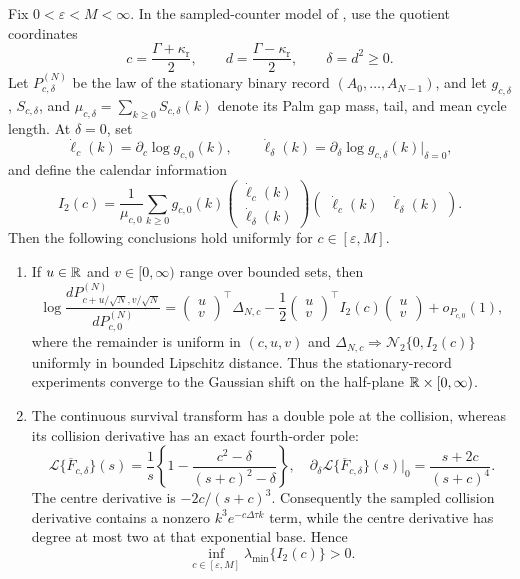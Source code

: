 \begin{paperthm}
\label{thm:stationary-two-state-collision-main}
Fix \(0<\varepsilon<M<\infty\).  In the sampled-counter model of
, use the quotient coordinates
\[
 c=\frac{\Gamma+\kappa_{\mathrm r}}2,
 \qquad d=\frac{\Gamma-\kappa_{\mathrm r}}2,
 \qquad \delta=d^2\ge0.
\tag{SC2}
\]
Let \(P_{c,\delta}^{(N)}\) be the law of the stationary binary record
\((A_0,\ldots,A_{N-1})\), and let \(g_{c,\delta}\), \(S_{c,\delta}\), and
\(\mu_{c,\delta}=\sum_{k\ge0}S_{c,\delta}(k)\) denote its Palm gap mass,
tail, and mean cycle length.  At \(\delta=0\), set
\[
 \dot\ell_c(k)=\partial_c\log g_{c,0}(k),\qquad
 \dot\ell_\delta(k)=\partial_\delta\log g_{c,\delta}(k)|_{\delta=0},
\]
and define the calendar information
\[
 I_2(c)=\frac1{\mu_{c,0}}
 \sum_{k\ge0}g_{c,0}(k)
 \begin{pmatrix}\dot\ell_c(k)\\ \dot\ell_\delta(k)\end{pmatrix}
 \begin{pmatrix}\dot\ell_c(k)&\dot\ell_\delta(k)\end{pmatrix}.
\tag{SC3}
\]
Then the following conclusions hold uniformly for \(c\in[\varepsilon,M]\).

\begin{enumerate}[label=\textup{(\roman*)},leftmargin=2.6em]
\item If \(u\in\mathbb{R}\) and \(v\in[0,\infty)\) range over bounded sets, then
\[
 \log\frac{dP_{c+u/\sqrt N,v/\sqrt N}^{(N)}}
               {dP_{c,0}^{(N)}}
 =\begin{pmatrix}u\\v\end{pmatrix}^{\!\top}\Delta_{N,c}
 -\frac12\begin{pmatrix}u\\v\end{pmatrix}^{\!\top}
 I_2(c)\begin{pmatrix}u\\v\end{pmatrix}+o_{P_{c,0}}(1),
\tag{SC4}
\]
where the remainder is uniform in \((c,u,v)\) and
\(\Delta_{N,c}\Rightarrow\mathcal N_2\{0,I_2(c)\}\) uniformly in bounded
Lipschitz distance.  Thus the stationary-record experiments converge to the
Gaussian shift on the half-plane \(\mathbb{R}\times[0,\infty)\).

\item The continuous survival transform has a double pole at the collision,
whereas its collision derivative has an exact fourth-order pole:
\[
 \mathcal L\{\overline F_{c,\delta}\}(s)
 =\frac1s\left\{1-
 \frac{c^2-\delta}{(s+c)^2-\delta}\right\},
\quad
 \partial_\delta\mathcal L\{\overline F_{c,\delta}\}(s)|_0
 =\frac{s+2c}{(s+c)^4}.
\tag{SC5}
\]
The centre derivative is \(-2c/(s+c)^3\).  Consequently the sampled
collision derivative contains a nonzero
\(k^3e^{-c\Delta\tau k}\) term, while the centre derivative has degree at
most two at that exponential base.  Hence
\[
 \inf_{c\in[\varepsilon,M]}\lambda_{\min}\{I_2(c)\}>0.
\tag{SC6}
\]


\end{enumerate}
\end{paperthm}
